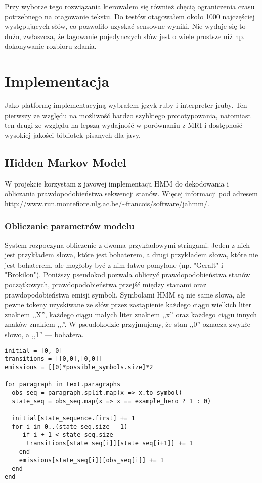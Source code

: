 \documentclass[10pt,a4paper]{article}
\begin{document}
		Przy wyborze tego rozwiązania kierowałem się również chęcią ograniczenia czasu potrzebnego na otagowanie tekstu. Do testów otagowałem około 1000 najczęściej występujących słów, co pozwoliło uzyskać sensowne wyniki. Nie wydaje się to dużo, zwłaszcza, że tagowanie pojedynczych słów jest o wiele prostsze niż np. dokonywanie rozbioru zdania.

\section{Implementacja}

	Jako platformę implementacyjną wybrałem język ruby i interpreter jruby. Ten pierwszy ze względu na możliwość bardzo szybkiego prototypowania, natomiast ten drugi ze względu na lepszą wydajność w porównaniu z MRI i dostępność wysokiej jakości bibliotek pisanych dla javy.

	\subsection{Hidden Markov Model}

		W projekcie korzystam z javowej implementacji HMM do dekodowania i obliczania prawdopodobieństwa sekwencji stanów. Więcej informacji pod adresem \url{http://www.run.montefiore.ulg.ac.be/~francois/software/jahmm/}.

		\subsubsection{Obliczanie parametrów modelu}

			System rozpoczyna obliczenie z dwoma przykładowymi stringami. Jeden z nich jest przykładem słowa, które jest bohaterem, a drugi przykładem słowa, które nie jest bohaterem, ale mogłoby być z nim łatwo pomylone (np. "Geralt" i "Brokilon"). Poniższy pseudokod pozwala obliczyć prawdopodobieństwa stanów początkowych, prawdopodobieństwa przejść między stanami oraz prawdopodobieństwa emisji symboli. Symbolami HMM są nie same słowa, ale pewne tokeny uzyskiwane ze słów przez zastąpienie każdego ciągu wielkich liter znakiem ,,X'', każdego ciągu małych liter znakiem ,,x'' oraz każdego ciągu innych znaków znakiem ,,.''. W pseudokodzie przyjmujemy, że stan ,,0'' oznacza zwykłe słowo, a ,,1'' --- bohatera.

\begin{verbatim}
initial = [0, 0]
transitions = [[0,0],[0,0]] 
emissions = [[0]*possible_symbols.size]*2

for paragraph in text.paragraphs
  obs_seq = paragraph.split.map(x => x.to_symbol)
  state_seq = obs_seq.map(x => x == example_hero ? 1 : 0)

  initial[state_sequence.first] += 1
  for i in 0..(state_seq.size - 1)
     if i + 1 < state_seq.size
      transitions[state_seq[i]][state_seq[i+1]] += 1
    end
    emissions[state_seq[i]][obs_seq[i]] += 1
  end
end
\end{verbatim}
\end{document}
